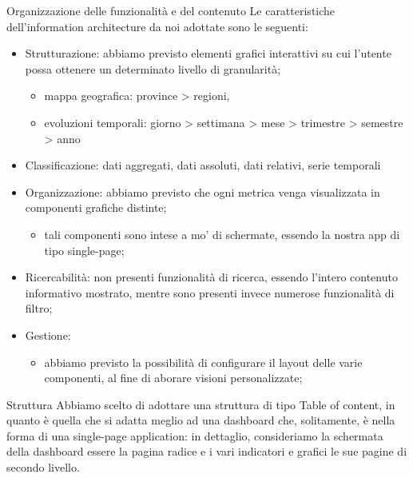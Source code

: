 Organizzazione delle funzionalità e del contenuto
Le caratteristiche dell'information architecture da noi adottate sono le seguenti:
\begin{itemize}
	\item Strutturazione: abbiamo previsto elementi grafici interattivi su cui l'utente possa ottenere un determinato livello di granularità;
	\begin{itemize}
		\item mappa geografica: province > regioni,
		\item evoluzioni temporali: giorno > settimana > mese > trimestre > semestre > anno
	\end{itemize}
	\item Classificazione: dati aggregati, dati assoluti, dati relativi, serie temporali
	\item Organizzazione: abbiamo previsto che ogni metrica venga visualizzata in componenti grafiche distinte;
	\begin{itemize}
		\item tali componenti sono intese a mo' di schermate, essendo la nostra app di tipo single-page;
	\end{itemize}
	\item Ricercabilità: non presenti funzionalità di ricerca, essendo l'intero contenuto informativo mostrato, mentre sono presenti invece numerose funzionalità di filtro;
	\item Gestione:
	\begin{itemize}
		\item abbiamo previsto la possibilità di configurare il layout delle varie componenti, al fine di aborare visioni personalizzate;
	\end{itemize}
\end{itemize}


Struttura
Abbiamo scelto di adottare una struttura di tipo Table of content, in quanto è quella che si adatta meglio ad una dashboard che, solitamente, è nella forma di una single-page application: in dettaglio, consideriamo la schermata della dashboard essere la pagina radice e i vari indicatori e grafici le sue pagine di secondo livello. 